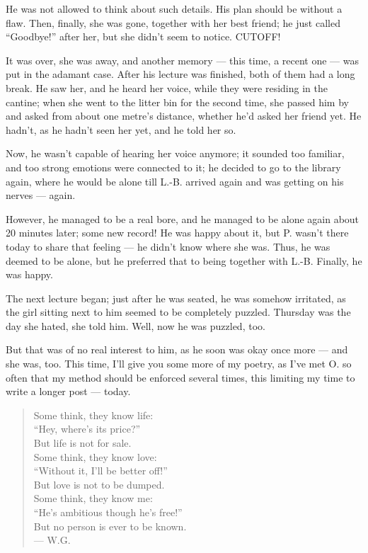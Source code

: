 He was not allowed to think about such details. 
His plan should be without a flaw. 
Then, finally, she was gone, together with her best friend; he just called \enquote{Goodbye!} after her, but she didn't seem to notice. 
CUTOFF!

It was over, she was away, and another memory --- this time, a recent one --- was put in the adamant case. 
After his lecture was finished, both of them had a long break. He saw her, and he heard her voice, while they were residing in the cantine; when she went to the litter bin for the second time, she passed him by and asked from about one metre's distance, whether he'd asked her friend yet. He hadn't, as he hadn't seen her yet, and he told her so.

Now, he wasn't capable of hearing her voice anymore; it sounded too familiar, and too strong emotions were connected to it; he decided to go to the library again, where he would be alone till L.-B. arrived again and was getting on his nerves --- again.

However, he managed to be a real bore, and he managed to be alone again about 20 minutes later; some new record!
He was happy about it, but P. wasn't there today to share that feeling --- he didn't know where she was. 
Thus, he was deemed to be alone, but he preferred that to being together with L.-B. 
Finally, he was happy.

The next lecture began; just after he was seated, he was somehow irritated, as the girl sitting next to him seemed to be completely puzzled. Thursday was the day she hated, she told him. Well, now he was puzzled, too.

But that was of no real interest to him, as he soon was okay once more --- and she was, too. 
This time, I'll give you some more of my poetry, as I've met O. so often that my method should be enforced several times, this limiting my time to write a longer post --- today. 

\begin{verse}
Some think, they know life:\\
\enquote{Hey, where's its price?}\\
But life is not for sale.\\
Some think, they know love:\\
\enquote{Without it, I'll be better off!}\\
But love is not to be dumped.\\
Some think, they know me:\\
\enquote{He's ambitious though he's free!}\\
But no person is ever to be known. \\
--- W.G.
\end{verse}

